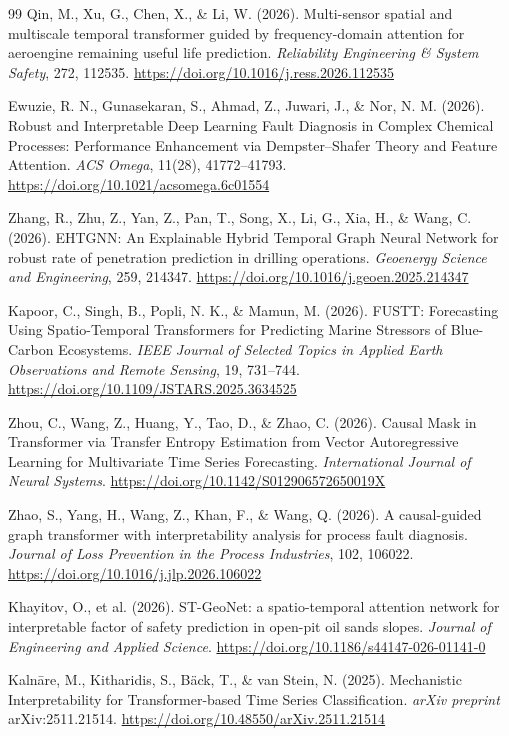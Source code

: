 \begin{thebibliography}{99}
 Qin, M., Xu, G., Chen, X., \& Li, W. (2026). Multi-sensor spatial and multiscale temporal transformer guided by frequency-domain attention for aeroengine remaining useful life prediction. \emph{Reliability Engineering \& System Safety}, 272, 112535. \url{https://doi.org/10.1016/j.ress.2026.112535}

 Ewuzie, R. N., Gunasekaran, S., Ahmad, Z., Juwari, J., \& Nor, N. M. (2026). Robust and Interpretable Deep Learning Fault Diagnosis in Complex Chemical Processes: Performance Enhancement via Dempster--Shafer Theory and Feature Attention. \emph{ACS Omega}, 11(28), 41772--41793. \url{https://doi.org/10.1021/acsomega.6c01554}

 Zhang, R., Zhu, Z., Yan, Z., Pan, T., Song, X., Li, G., Xia, H., \& Wang, C. (2026). EHTGNN: An Explainable Hybrid Temporal Graph Neural Network for robust rate of penetration prediction in drilling operations. \emph{Geoenergy Science and Engineering}, 259, 214347. \url{https://doi.org/10.1016/j.geoen.2025.214347}

 Kapoor, C., Singh, B., Popli, N. K., \& Mamun, M. (2026). FUSTT: Forecasting Using Spatio-Temporal Transformers for Predicting Marine Stressors of Blue-Carbon Ecosystems. \emph{IEEE Journal of Selected Topics in Applied Earth Observations and Remote Sensing}, 19, 731--744. \url{https://doi.org/10.1109/JSTARS.2025.3634525}

 Zhou, C., Wang, Z., Huang, Y., Tao, D., \& Zhao, C. (2026). Causal Mask in Transformer via Transfer Entropy Estimation from Vector Autoregressive Learning for Multivariate Time Series Forecasting. \emph{International Journal of Neural Systems}. \url{https://doi.org/10.1142/S012906572650019X}

 Zhao, S., Yang, H., Wang, Z., Khan, F., \& Wang, Q. (2026). A causal-guided graph transformer with interpretability analysis for process fault diagnosis. \emph{Journal of Loss Prevention in the Process Industries}, 102, 106022. \url{https://doi.org/10.1016/j.jlp.2026.106022}

 Khayitov, O., et al. (2026). ST-GeoNet: a spatio-temporal attention network for interpretable factor of safety prediction in open-pit oil sands slopes. \emph{Journal of Engineering and Applied Science}. \url{https://doi.org/10.1186/s44147-026-01141-0}

 Kaln\={a}re, M., Kitharidis, S., B\"ack, T., \& van Stein, N. (2025). Mechanistic Interpretability for Transformer-based Time Series Classification. \emph{arXiv preprint} arXiv:2511.21514. \url{https://doi.org/10.48550/arXiv.2511.21514}


\end{thebibliography}
